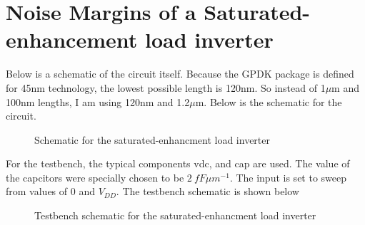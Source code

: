 \documentclass[12pt]{article}
\begin{document}
\section{Noise Margins of a Saturated-enhancement load inverter}
Below is a schematic of the circuit itself. Because the GPDK package is defined for 45nm technology, the lowest possible length is 120nm.
So instead of 1$\mu$m and 100nm lengths, I am using 120nm and 1.2$\mu$m. Below is the schematic for the circuit.
\begin{figure} [H]
    \centering
    \caption{Schematic for the saturated-enhancment load inverter}
\end{figure}
For the testbench, the typical components vdc, and cap are used. The value of the capcitors were
specially chosen to be $\SI{2}{fF \mu m^{-1}}$. The input is set to sweep from values of 0 and $V_{DD}$.
The testbench schematic is shown below
\begin{figure} [H]
    \centering
    \caption{Testbench schematic for the saturated-enhancment load inverter}
\end{figure}
\end{document}
